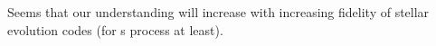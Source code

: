 Seems that our understanding will increase with increasing fidelity of
stellar evolution codes (for s process at least).
